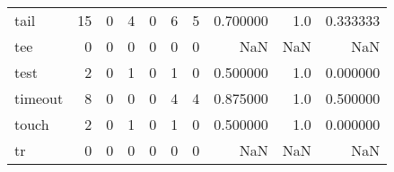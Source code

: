 \begin{longtable}{lrrrrrrrrr}
tail      &                                                 15 &                                                  0 &                                                  4 &                                                  0 &                                                  6 &                                                  5 &                                           0.700000 &                                    1.0 &                             0.333333 \\
tee       &                                                  0 &                                                  0 &                                                  0 &                                                  0 &                                                  0 &                                                  0 &                                                NaN &                                    NaN &                                  NaN \\
test      &                                                  2 &                                                  0 &                                                  1 &                                                  0 &                                                  1 &                                                  0 &                                           0.500000 &                                    1.0 &                             0.000000 \\
timeout   &                                                  8 &                                                  0 &                                                  0 &                                                  0 &                                                  4 &                                                  4 &                                           0.875000 &                                    1.0 &                             0.500000 \\
touch     &                                                  2 &                                                  0 &                                                  1 &                                                  0 &                                                  1 &                                                  0 &                                           0.500000 &                                    1.0 &                             0.000000 \\
tr        &                                                  0 &                                                  0 &                                                  0 &                                                  0 &                                                  0 &                                                  0 &                                                NaN &                                    NaN &                                  NaN \\

\end{longtable}
